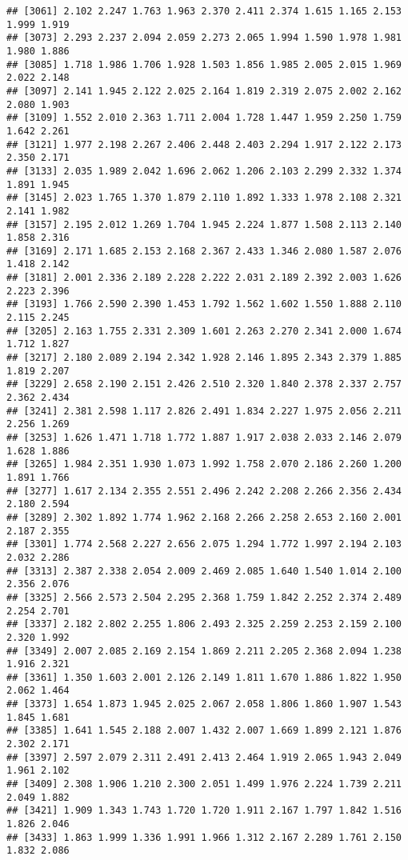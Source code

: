 \documentclass[
]{article}
\begin{document}
\begin{verbatim}
## [3061] 2.102 2.247 1.763 1.963 2.370 2.411 2.374 1.615 1.165 2.153 1.999 1.919
## [3073] 2.293 2.237 2.094 2.059 2.273 2.065 1.994 1.590 1.978 1.981 1.980 1.886
## [3085] 1.718 1.986 1.706 1.928 1.503 1.856 1.985 2.005 2.015 1.969 2.022 2.148
## [3097] 2.141 1.945 2.122 2.025 2.164 1.819 2.319 2.075 2.002 2.162 2.080 1.903
## [3109] 1.552 2.010 2.363 1.711 2.004 1.728 1.447 1.959 2.250 1.759 1.642 2.261
## [3121] 1.977 2.198 2.267 2.406 2.448 2.403 2.294 1.917 2.122 2.173 2.350 2.171
## [3133] 2.035 1.989 2.042 1.696 2.062 1.206 2.103 2.299 2.332 1.374 1.891 1.945
## [3145] 2.023 1.765 1.370 1.879 2.110 1.892 1.333 1.978 2.108 2.321 2.141 1.982
## [3157] 2.195 2.012 1.269 1.704 1.945 2.224 1.877 1.508 2.113 2.140 1.858 2.316
## [3169] 2.171 1.685 2.153 2.168 2.367 2.433 1.346 2.080 1.587 2.076 1.418 2.142
## [3181] 2.001 2.336 2.189 2.228 2.222 2.031 2.189 2.392 2.003 1.626 2.223 2.396
## [3193] 1.766 2.590 2.390 1.453 1.792 1.562 1.602 1.550 1.888 2.110 2.115 2.245
## [3205] 2.163 1.755 2.331 2.309 1.601 2.263 2.270 2.341 2.000 1.674 1.712 1.827
## [3217] 2.180 2.089 2.194 2.342 1.928 2.146 1.895 2.343 2.379 1.885 1.819 2.207
## [3229] 2.658 2.190 2.151 2.426 2.510 2.320 1.840 2.378 2.337 2.757 2.362 2.434
## [3241] 2.381 2.598 1.117 2.826 2.491 1.834 2.227 1.975 2.056 2.211 2.256 1.269
## [3253] 1.626 1.471 1.718 1.772 1.887 1.917 2.038 2.033 2.146 2.079 1.628 1.886
## [3265] 1.984 2.351 1.930 1.073 1.992 1.758 2.070 2.186 2.260 1.200 1.891 1.766
## [3277] 1.617 2.134 2.355 2.551 2.496 2.242 2.208 2.266 2.356 2.434 2.180 2.594
## [3289] 2.302 1.892 1.774 1.962 2.168 2.266 2.258 2.653 2.160 2.001 2.187 2.355
## [3301] 1.774 2.568 2.227 2.656 2.075 1.294 1.772 1.997 2.194 2.103 2.032 2.286
## [3313] 2.387 2.338 2.054 2.009 2.469 2.085 1.640 1.540 1.014 2.100 2.356 2.076
## [3325] 2.566 2.573 2.504 2.295 2.368 1.759 1.842 2.252 2.374 2.489 2.254 2.701
## [3337] 2.182 2.802 2.255 1.806 2.493 2.325 2.259 2.253 2.159 2.100 2.320 1.992
## [3349] 2.007 2.085 2.169 2.154 1.869 2.211 2.205 2.368 2.094 1.238 1.916 2.321
## [3361] 1.350 1.603 2.001 2.126 2.149 1.811 1.670 1.886 1.822 1.950 2.062 1.464
## [3373] 1.654 1.873 1.945 2.025 2.067 2.058 1.806 1.860 1.907 1.543 1.845 1.681
## [3385] 1.641 1.545 2.188 2.007 1.432 2.007 1.669 1.899 2.121 1.876 2.302 2.171
## [3397] 2.597 2.079 2.311 2.491 2.413 2.464 1.919 2.065 1.943 2.049 1.961 2.102
## [3409] 2.308 1.906 1.210 2.300 2.051 1.499 1.976 2.224 1.739 2.211 2.049 1.882
## [3421] 1.909 1.343 1.743 1.720 1.720 1.911 2.167 1.797 1.842 1.516 1.826 2.046
## [3433] 1.863 1.999 1.336 1.991 1.966 1.312 2.167 2.289 1.761 2.150 1.832 2.086

\end{verbatim}
\end{document}
